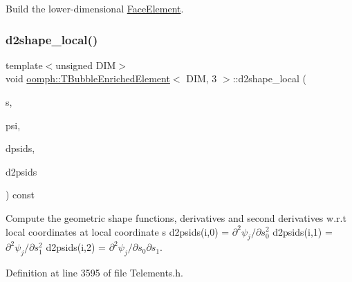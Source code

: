 Build the lower-\/dimensional \hyperlink{classoomph_1_1FaceElement}{Face\+Element}. 

\mbox{\label{classoomph_1_1TBubbleEnrichedElement_3_01DIM_00_013_01_4_af362359deb0709dc5d42b29eaf776152}} 
\subsubsection{\texorpdfstring{d2shape\+\_\+local()}{d2shape\_local()}}
{\footnotesize\ttfamily template$<$unsigned D\+IM$>$ \\
void \hyperlink{classoomph_1_1TBubbleEnrichedElement}{oomph\+::\+T\+Bubble\+Enriched\+Element}$<$ D\+IM, 3 $>$\+::d2shape\+\_\+local (\begin{DoxyParamCaption}\item[{const \hyperlink{classoomph_1_1Vector}{Vector}$<$ double $>$ \&}]{s,  }\item[{\hyperlink{classoomph_1_1Shape}{Shape} \&}]{psi,  }\item[{\hyperlink{classoomph_1_1DShape}{D\+Shape} \&}]{dpsids,  }\item[{\hyperlink{classoomph_1_1DShape}{D\+Shape} \&}]{d2psids }\end{DoxyParamCaption}) const\hspace{0.3cm}{\ttfamily [inline]}}



Compute the geometric shape functions, derivatives and second derivatives w.\+r.\+t local coordinates at local coordinate s d2psids(i,0) = $ \partial^2 \psi_j / \partial s_0^2 $ d2psids(i,1) = $ \partial^2 \psi_j / \partial s_1^2 $ d2psids(i,2) = $ \partial^2 \psi_j / \partial s_0 \partial s_1 $. 



Definition at line 3595 of file Telements.\+h.

\mbox{\label{classoomph_1_1TBubbleEnrichedElement_3_01DIM_00_013_01_4_abf68d2c613e7876e949bbd61765d0c91}} 
